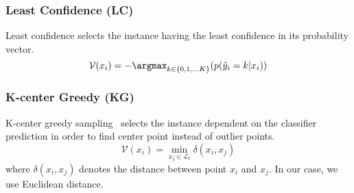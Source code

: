 \subsubsection{Least Confidence (LC)}
    Least confidence selects the instance having the least confidence in its probability vector. 
    $$ \mathcal{V}(x_i) = - \argmax_{k \in \{0,1,..,K\}}(p(\hat{y}_i=k|x_i))$$

\subsubsection{K-center Greedy (KG)}
    K-center greedy sampling~\cite{sener2017geometric} selects the instance dependent on the classifier prediction in order to find center point instead of outlier points.
    $$\mathcal{V}(x_i) = \min_{x_j \in \mathcal{L}_t}\delta(x_i,x_j)$$
    where $\delta(x_i,x_j)$ denotes the distance between point $x_i$ and $x_j$. In our case, we use Euclidean distance.
    

